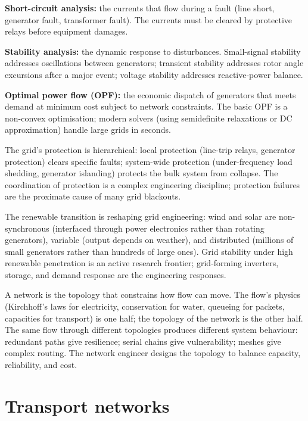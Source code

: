 \textbf{Short-circuit analysis:} the currents that flow during a fault (line short, generator fault, transformer fault). The currents must be cleared by protective relays before equipment damages.

\textbf{Stability analysis:} the dynamic response to disturbances. Small-signal stability addresses oscillations between generators; transient stability addresses rotor angle excursions after a major event; voltage stability addresses reactive-power balance.

\textbf{Optimal power flow (OPF):} the economic dispatch of generators that meets demand at minimum cost subject to network constraints. The basic OPF is a non-convex optimisation; modern solvers (using semidefinite relaxations or DC approximation) handle large grids in seconds.

The grid's protection is hierarchical: local protection (line-trip relays, generator protection) clears specific faults; system-wide protection (under-frequency load shedding, generator islanding) protects the bulk system from collapse. The coordination of protection is a complex engineering discipline; protection failures are the proximate cause of many grid blackouts.

The renewable transition is reshaping grid engineering: wind and solar are non-synchronous (interfaced through power electronics rather than rotating generators), variable (output depends on weather), and distributed (millions of small generators rather than hundreds of large ones). Grid stability under high renewable penetration is an active research frontier; grid-forming inverters, storage, and demand response are the engineering responses.

\begin{archetype}
A network is the topology that constrains how flow can move. The flow's physics (Kirchhoff's laws for electricity, conservation for water, queueing for packets, capacities for transport) is one half; the topology of the network is the other half. The same flow through different topologies produces different system behaviour: redundant paths give resilience; serial chains give vulnerability; meshes give complex routing. The network engineer designs the topology to balance capacity, reliability, and cost.
\end{archetype}

\section{Transport networks}

